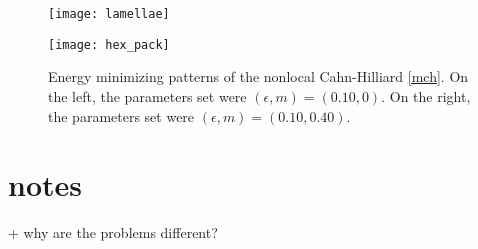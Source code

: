\begin{figure}[htb!]
        \centering
\begin{minipage}{0.46\textwidth}
       \texttt{[image: lamellae]}
\end{minipage}
\begin{minipage}{0.46\textwidth}
       \texttt{[image: hex\_pack]}
\end{minipage}
\caption[{Energy minimizing patterns of the nonlocal Cahn-Hilliard \cref{mch}.}]{Energy minimizing patterns of the nonlocal Cahn-Hilliard \cref{mch}. On the left, the parameters set were $(\epsilon, m) = (0.10,0)$. On the right, the parameters set were $(\epsilon,m)=(0.10,0.40)$.}
\label{fig:mchp energy minimizers}
\end{figure}



\section{notes}
+ why are the problems different?

